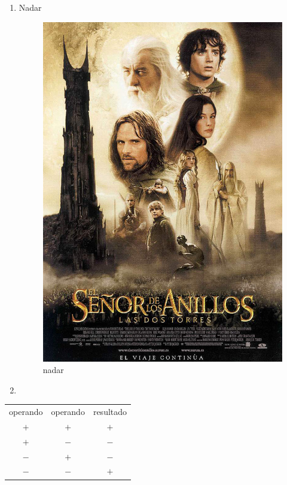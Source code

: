 \begin{enumerate}
  
      
\item Nadar

  \begin{figure}[h] 
    \centering
    \includegraphics[scale=0.5]{IMG/13.jpg}
    \caption{\small nadar} \label{fig:2}
  \end{figure}
  
\item
\end{enumerate}

\begin{table}[h]
  \centering
  \begin{tabular}{ c c c }
    \hline
    operando & operando & resultado\\
    $+$ & $+$ & $+$\\
    $+$ & $-$ & $-$\\
    $-$ & $+$ & $-$\\
    $-$ & $-$ & $+$\\
    \hline
  \end{tabular}
\end{table}

